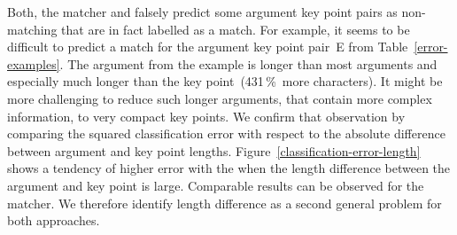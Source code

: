 Both, the \BertBase matcher and \RobertaBase falsely predict some argument key point pairs as non-matching that are in 
fact labelled as a match.
For example, it seems to be difficult to predict a match for the argument key point pair~E from Table~\ref{error-examples}.
The argument from the example is longer than most arguments and especially much longer than the key point~(431\,\%~more characters).
It might be more challenging to reduce such longer arguments, that contain more complex information, to very compact key points.
We confirm that observation by comparing the squared classification error with respect to the absolute difference between 
argument and key point lengths.
Figure~\ref{classification-error-length} shows a tendency of higher error with the \BertBase when the length difference 
between the argument and key point is large.
Comparable results can be observed for the \RobertaBase matcher.
We therefore identify length difference as a second general problem for both approaches.
